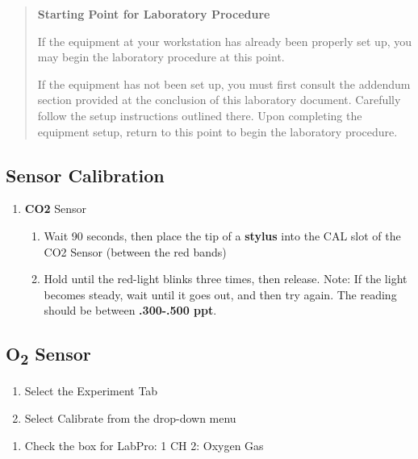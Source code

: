 \documentclass[
  letterpaper,
  DIV=11,
  numbers=noendperiod]{scrreprt}
\providecommand{\tightlist}{%
  \setlength{\itemsep}{0pt}\setlength{\parskip}{0pt}}
\begin{document}
\begin{quote}
\textbf{Starting Point for Laboratory Procedure}

If the equipment at your workstation has already been properly set up,
you may begin the laboratory procedure at this point.

If the equipment has not been set up, you must first consult the
addendum section provided at the conclusion of this laboratory document.
Carefully follow the setup instructions outlined there. Upon completing
the equipment setup, return to this point to begin the laboratory
procedure.
\end{quote}

\subsection{\texorpdfstring{\textbf{Sensor
Calibration}}{Sensor Calibration}}\label{sensor-calibration}

\begin{enumerate}
\def\labelenumi{\arabic{enumi}.}
\item
  \textbf{CO2} Sensor

  \begin{enumerate}
  \def\labelenumii{\alph{enumii}.}
  \item
    Wait 90 seconds, then place the tip of a \textbf{stylus} into the
    CAL slot of the CO2 Sensor (between the red bands)
  \item
    Hold until the red-light blinks three times, then release. Note: If
    the light becomes steady, wait until it goes out, and then try
    again. The reading should be between \textbf{.300-.500 ppt}.
  \end{enumerate}
\end{enumerate}

\subsection{\texorpdfstring{\textbf{O\textsubscript{2}
Sensor}}{O2 Sensor}}\label{o2-sensor}

\begin{enumerate}
\def\labelenumi{\alph{enumi}.}
\item
  Select the Experiment Tab
\item
  Select Calibrate from the drop-down menu
\end{enumerate}

\begin{enumerate}
\def\labelenumi{\arabic{enumi}.}
\setcounter{enumi}{2}
\tightlist
\item
  Check the box for LabPro: 1 CH 2: Oxygen Gas \textquotesingle{}
\end{enumerate}
\end{document}
